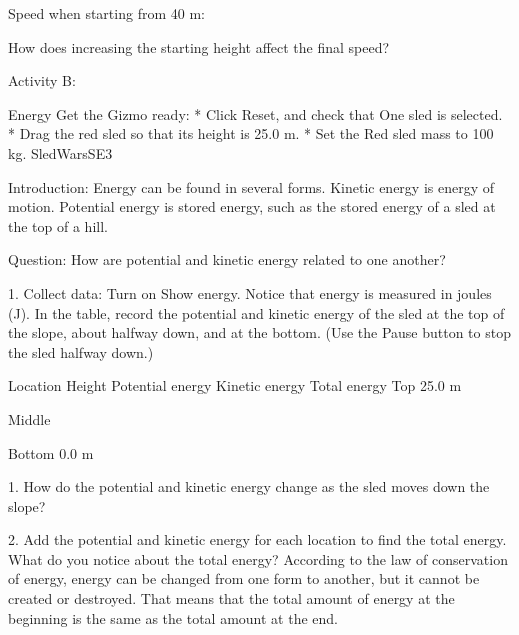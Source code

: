 	Speed when starting from 40 m:
	

	

How does increasing the starting height affect the final speed? 




	                        


Activity B: 


Energy
	Get the Gizmo ready: 
         * Click Reset, and check that One sled is selected. 
         * Drag the red sled so that its height is 25.0 m. 
         * Set the Red sled mass to 100 kg.
	 SledWarsSE3 

	

Introduction: Energy can be found in several forms. Kinetic energy is energy of motion. Potential energy is stored energy, such as the stored energy of a sled at the top of a hill. 


Question: How are potential and kinetic energy related to one another?


         1. Collect data: Turn on Show energy. Notice that energy is measured in joules (J). In the table, record the potential and kinetic energy of the sled at the top of the slope, about halfway down, and at the bottom. (Use the Pause button to stop the sled halfway down.)


Location
	Height
	Potential energy
	Kinetic energy
	Total energy
	Top
	25.0 m
	

	

	

	Middle
	

	

	

	

	Bottom
	0.0 m
	

	

	

	

         1. How do the potential and kinetic energy change as the sled moves down the slope?




	

         2. Add the potential and kinetic energy for each location to find the total energy. What do you notice about the total energy? According to the law of conservation of energy, energy can be changed from one form to another, but it cannot be created or destroyed. That means that the total amount of energy at the beginning is the same as the total amount at the end.




